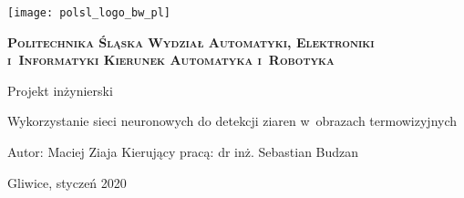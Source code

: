 \newpage
\thispagestyle{empty}
\begin{onehalfspacing}
\begin{center}
	\texttt{[image: polsl\_logo\_bw\_pl]}
	\vspace{0.8cm}
	
	\fontsize{18}{18} \selectfont
	\textbf{\textsc{Politechnika Śląska \linebreak
	Wydział Automatyki, Elektroniki i~Informatyki \linebreak
	Kierunek Automatyka i~Robotyka}}
	\vspace{1.3cm}
	
	\fontsize{16}{16} \selectfont
	Projekt inżynierski
	\vspace{1.7cm}
	
	\fontsize{14}{14} \selectfont
	Wykorzystanie sieci neuronowych do detekcji ziaren
	w~obrazach termowizyjnych
	\vspace{5cm}
	
	\begin{flushleft}
	Autor: Maciej Ziaja \linebreak
	Kierujący pracą: dr inż. Sebastian Budzan \linebreak
	\end{flushleft}
	
	\vfill
	\fontsize{12}{12} \selectfont
	Gliwice, styczeń 2020
\end{center}
\end{onehalfspacing}
\restoregeometry
